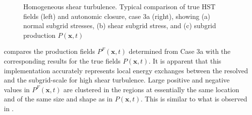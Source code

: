 
%
\begin{figure}
	\centering %
	\label{F:HST_CL24a}
\end{figure}
%
\begin{figure}
	\ContinuedFloat
	\centering %
	\label{F:HST_CL24b}
\end{figure}
%
\begin{figure}
	\ContinuedFloat
	\centering %
	\label{F:HST_CL24c}
\end{figure}
%
\begin{figure}
	\ContinuedFloat
	\caption{Homogeneous shear turbulence. Typical comparison of  true HST fields (left) and autonomic closure, case 3a (right), showing (a) normal subgrid stresses, (b) shear subgrid stress, and (c) subgrid production $P(\mathbf{x},t)$}
	\label{F:HST_CL24}
\end{figure}
%
%

  compares the production fields $P^F(\mathbf{x},t)$ determined from Case 3a  with the corresponding results for the true fields $P(\mathbf{x},t)$. It is apparent that this implementation accurately represents local energy exchanges between the resolved and the subgrid-scale for high shear turbulence. Large positive and negative values in $P^F(\mathbf{x},t)$ are clustered in the regions at essentially the same location and of the same size and shape as in $P(\mathbf{x},t)$. This is similar to what is observed in . 


